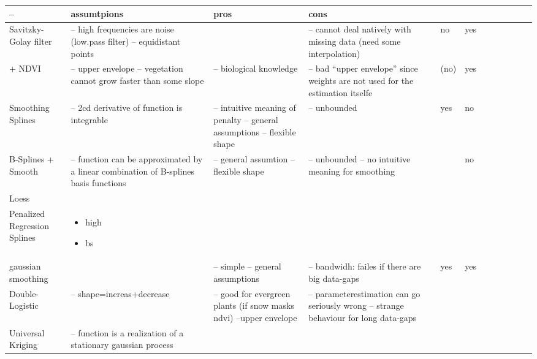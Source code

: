\begin{table}[!ht]
    \centering
    \footnotesize
    \begin{tabular}{p{1.6cm}p{3.3cm}p{3.3cm}p{3.3cm}p{0.4cm}p{0.4cm}p{3cm}p{3cm}p{3cm}p{3cm}p{3cm}p{3cm}|}
    -- &
	assumtpions &
	pros &
	cons &
	\rotatebox{90}{weights} &
	\rotatebox{90}{bounded} \\ \hline
    
    Savitzky-Golay filter &
	-- high frequencies are noise (low.pass filter) -- equidistant points &
	~ &
	-- cannot deal natively with missing data (need some interpolation) &
	no &
	yes \\ %
    
    + NDVI &
	-- upper envelope -- vegetation cannot grow faster than some slope &
	-- biological knowledge  &
	-- bad ``upper envelope'' since weights are not used for the estimation itselfe &
	(no) &
	yes \\ %
    
    Smoothing Splines &
	-- 2cd derivative of function is integrable &
	-- intuitive meaning of penalty -- general assumptions -- flexible shape &
	-- unbounded &
	yes &
	no \\ %
    
    B-Splines + Smooth &
	-- function can be approximated by a linear combination of B-splines basis functions &
	-- general assumtion -- flexible shape &
	-- unbounded -- no intuitive meaning for smoothing &
	~ &
	no \\ %
    
    Loess &
	~ &
	~ &
	~ &
	~ &
	~ \\ %

    Penalized Regression Splines &
	\begin{itemize}
        \item high
        \item bs
    \end{itemize} &
	~ &
	~ &
	~ &
	~ \\ %
    
    gaussian smoothing &
	~ &
	-- simple -- general assumptions &
	-- bandwidh: failes if there are big data-gaps  &
	yes &
	yes \\ %
    
    Double-Logistic &
	-- shape=increas+decrease  &
	-- good for evergreen plants (if snow masks ndvi) --upper envelope  &
	-- parameterestimation can go seriously wrong -- strange behaviour for long data-gaps &
	~ &
	~ \\ %
    
    Universal Kriging &
	-- function is a realization of a stationary gaussian process &
	~ &
	~ &
	~ &
	~ \\ %
    \hline
    \end{tabular}
    \normalsize
\end{table}

